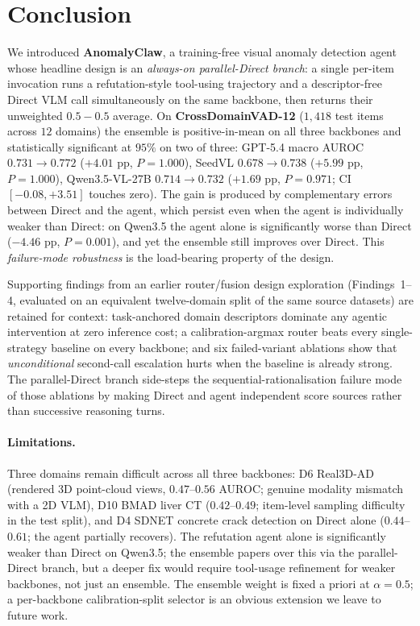 \section{Conclusion}
\label{sec:conclusion}

We introduced \textbf{AnomalyClaw}, a training-free visual anomaly detection agent whose headline design is an \emph{always-on parallel-Direct branch}: a single per-item invocation runs a refutation-style tool-using trajectory and a descriptor-free Direct VLM call simultaneously on the same backbone, then returns their unweighted $0.5{-}0.5$ average. On \textbf{CrossDomainVAD-12} ($1{,}418$ test items across $12$ domains) the ensemble is positive-in-mean on all three backbones and statistically significant at $95\%$ on two of three: GPT-5.4 macro AUROC $0.731\!\to\!0.772$ ($+4.01$ pp, $P{=}1.000$), SeedVL $0.678\!\to\!0.738$ ($+5.99$ pp, $P{=}1.000$), Qwen3.5-VL-27B $0.714\!\to\!0.732$ ($+1.69$ pp, $P{=}0.971$; CI $[-0.08,+3.51]$ touches zero). The gain is produced by complementary errors between Direct and the agent, which persist even when the agent is individually weaker than Direct: on Qwen3.5 the agent alone is significantly worse than Direct ($-4.46$ pp, $P{=}0.001$), and yet the ensemble still improves over Direct. This \emph{failure-mode robustness} is the load-bearing property of the design.

Supporting findings from an earlier router/fusion design exploration (Findings~1--4, evaluated on an equivalent twelve-domain split of the same source datasets) are retained for context: task-anchored domain descriptors dominate any agentic intervention at zero inference cost; a calibration-argmax router beats every single-strategy baseline on every backbone; and six failed-variant ablations show that \emph{unconditional} second-call escalation hurts when the baseline is already strong. The parallel-Direct branch side-steps the sequential-rationalisation failure mode of those ablations by making Direct and agent independent score sources rather than successive reasoning turns.

\paragraph{Limitations.}
Three domains remain difficult across all three backbones: D6 Real3D-AD (rendered 3D point-cloud views, $0.47$--$0.56$ AUROC; genuine modality mismatch with a 2D VLM), D10 BMAD liver CT ($0.42$--$0.49$; item-level sampling difficulty in the test split), and D4 SDNET concrete crack detection on Direct alone ($0.44$--$0.61$; the agent partially recovers). The refutation agent alone is significantly weaker than Direct on Qwen3.5; the ensemble papers over this via the parallel-Direct branch, but a deeper fix would require tool-usage refinement for weaker backbones, not just an ensemble. The ensemble weight is fixed a priori at $\alpha{=}0.5$; a per-backbone calibration-split selector is an obvious extension we leave to future work.

